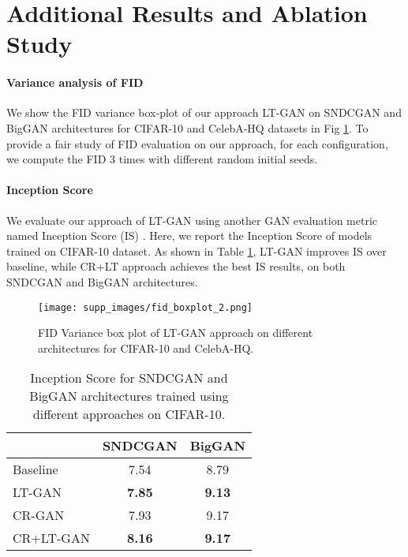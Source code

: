 \documentclass[10pt,twocolumn,letterpaper]{article}
\newcommand{\appendixhead}{\centering {\huge Supplementary}
\vspace{0.25in}}
\begin{document}
\twocolumn[\appendixhead]






\section{Additional Results and Ablation Study}\label{sec:more_results}


\paragraph{Variance analysis of FID}
We show the FID \cite{fid2017martin} variance box-plot of our approach LT-GAN on SNDCGAN \cite{sngan_proj} and BigGAN \cite{biggan2018brock} architectures for CIFAR-10 and CelebA-HQ datasets in Fig \ref{fig:boxplot}. To provide a fair study of FID evaluation on our approach, for each configuration, we compute the FID 3 times with different random initial seeds.


\paragraph{Inception Score}
We evaluate our approach of LT-GAN using another GAN evaluation metric named Inception Score (IS) \cite{inception2016}. Here, we report the Inception Score of models trained on CIFAR-10 dataset. As shown in Table \ref{tab:inception_score},  LT-GAN improves IS over baseline, while CR+LT approach achieves the best IS results, on both SNDCGAN and BigGAN architectures.





\begin{figure}[b]
\centering
    \texttt{[image: supp\_images/fid\_boxplot\_2.png]} 
\caption{\footnotesize{FID Variance box plot of LT-GAN approach on different architectures for CIFAR-10 and CelebA-HQ.}}
    \label{fig:boxplot}
\end{figure}

\begin{table}[b]
\centering
\begin{tabular}{|l|c|c|}
\hline
         & SNDCGAN & BigGAN \\ \hline
Baseline  & 7.54             & 8.79            \\
LT-GAN    & \textbf{7.85}             & \textbf{9.13}            \\ \hline
CR-GAN    & 7.93             &  9.17              \\
CR+LT-GAN & \textbf{8.16}             & \textbf{9.17}            \\ \hline
\end{tabular}
\caption{\footnotesize{Inception Score for SNDCGAN and BigGAN architectures trained using different approaches on CIFAR-10.}}
\label{tab:inception_score}
\end{table}
\end{document}
